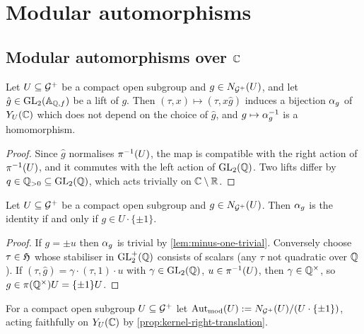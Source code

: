 \section{Modular automorphisms}\label{sec:automorphisms}

\subsection{Modular automorphisms over $\mathbb{C}$}

\begin{lemma}\label{lem:right-translation}
Let $U \subseteq \mathcal{G}^{+}$ be a compact open subgroup and
$g \in N_{\mathcal{G}^{+}}(U)$, and let $\hat g \in \GL{2}{\FiniteAdeles{\QQ}}$
be a lift of $g$. Then $(\tau, x) \mapsto (\tau, x\hat g)$ induces a
bijection $\alpha_{g}$ of $Y_{U}(\mathbb{C})$ which does not depend on
the choice of $\hat g$, and $g \mapsto \alpha_{g}^{-1}$ is a homomorphism.
\end{lemma}

\begin{proof}
Since $\hat g$ normalises $\pi^{-1}(U)$, the map is
compatible with the right action of $\pi^{-1}(U)$, and it
commutes with the left action of $\GL{2}{\QQ}$. Two lifts differ by
$q \in \PositiveRationals \subseteq \GL{2}{\QQ}$, which acts trivially on
$\mathbb{C}\setminus\mathbb{R}$.
\end{proof}

\begin{proposition}\label{prop:kernel-right-translation}
Let $U \subseteq \mathcal{G}^{+}$ be a compact open subgroup and
$g \in N_{\mathcal{G}^{+}}(U)$. Then $\alpha_{g}$ is the identity if
and only if $g \in U\cdot\{\pm 1\}$.
\end{proposition}

\begin{proof}
If $g = \pm u$ then $\alpha_{g}$ is trivial by \cref{lem:minus-one-trivial}.
Conversely choose $\tau \in \mathfrak{H}$ whose stabiliser in
$\mathrm{GL}_{2}^{+}(\mathbb{Q})$ consists of scalars (any $\tau$ not quadratic over $\mathbb{Q}$).
If $(\tau, \hat g) = \gamma\cdot(\tau, 1)\cdot u$ with $\gamma \in \GL{2}{\QQ}$,
$u \in \pi^{-1}(U)$, then $\gamma \in \mathbb{Q}^{\times}$, so
$g \in \pi(\mathbb{Q}^{\times})U = \{\pm 1\}U$.
\end{proof}

\begin{definition}\label{def:modular-aut}
For a compact open subgroup $U \subseteq \mathcal{G}^{+}$ let
$\operatorname{Aut}_{\mathrm{mod}}(U) := N_{\mathcal{G}^{+}}(U)/(U\cdot\{\pm 1\})$, acting
faithfully on $Y_{U}(\mathbb{C})$ by \cref{prop:kernel-right-translation}.
\end{definition}


